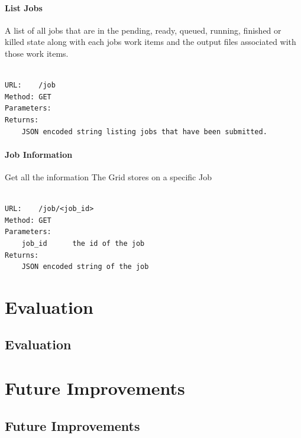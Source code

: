 \subsection{List Jobs}
\label{listjobs}

A list of all jobs that are in the pending, ready, queued, running, finished or killed state along with each jobs work items and the output files associated with those work items.

\begin{adjustwidth}{2.5em}{2.5em}
\begin{verbatim}

URL:    /job
Method: GET
Parameters:
Returns:    
    JSON encoded string listing jobs that have been submitted.

\end{verbatim}
\end{adjustwidth}

\subsection{Job Information}
\label{jobinformation}

Get all the information The Grid stores on a specific Job

\begin{adjustwidth}{2.5em}{2.5em}
\begin{verbatim}

URL:    /job/<job_id>
Method: GET
Parameters:
    job_id      the id of the job
Returns:    
    JSON encoded string of the job

\end{verbatim}
\end{adjustwidth}

\part{Evaluation}
\label{evaluation}

\chapter{Evaluation}
\label{evaluation}

\part{Future Improvements}
\label{futureimprovements}

\chapter{Future Improvements}
\label{futureimprovements}

